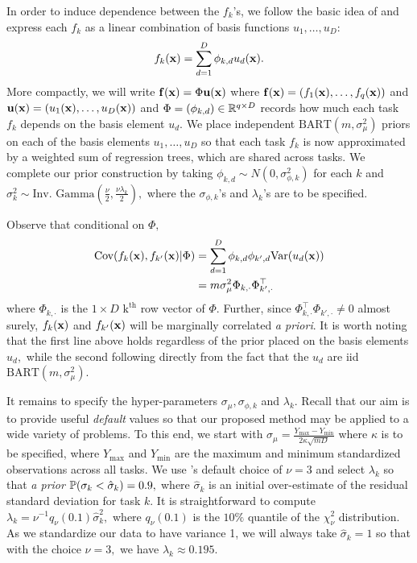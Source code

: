 \documentclass[12pt]{article}
\begin{document}
In order to induce dependence between the $f_{k}$'s, we follow the basic idea of \citet{Teh2005} and express each $f_{k}$ as a linear combination of basis functions $u_{1}, \ldots, u_{D}$:
$$
f_{k}(\bx) = \sum_{d = 1}^{D}{\phi_{k,d}u_{d}(\bx)}.
$$
More compactly, we will write $\bf(\bx) = \Phi\bu(\bx)$ where $\bf(\bx) = (f_{1}(\bx), \ldots, f_{q}(\bx))$ and $\bu(\bx) = (u_{1}(\bx), \ldots, u_{D}(\bx))$ and $\Phi = (\phi_{k,d}) \in \R^{q \times D}$ records how much each task $f_{k}$ depends on the basis element $u_{d}.$
We place independent $\text{BART}(m, \sigma^{2}_{\mu})$ priors on each of the basis elements $u_{1}, \ldots, u_{D}$ so that each task $f_{k}$ is now approximated by a weighted sum of regression trees, which are shared across tasks.
We complete our prior construction by taking $\phi_{k,d} \sim N(0,\sigma^{2}_{\phi,k})$ for each $k$ and $\sigma^{2}_{k} \sim \text{Inv. Gamma}\left(\frac{\nu}{2}, \frac{\nu\lambda_{k}}{2}\right),$ where the $\sigma_{\phi,k}$'s and $\lambda_{k}$'s are to be specified. 

Observe that conditional on $\Phi,$ 
\begin{align*}
\text{Cov}(f_{k}(\bx), f_{k'}(\bx) | \Phi) &= \sum_{d = 1}^{D}{\phi_{k,d}\phi_{k',d}\text{Var}(u_{d}(\bx))} \\
&= m\sigma^{2}_{\mu}\Phi_{k,\cdot}\Phi_{k',\cdot}^{\top}
\end{align*}
where $\Phi_{k,\cdot}$ is the $1 \times D$ $\text{k}^{\text{th}}$ row vector of $\Phi.$
Further, since $\Phi_{k,\cdot}^{\top}\Phi_{k',\cdot} \neq 0$ almost surely, $f_{k}(\bx)$ and $f_{k'}(\bx)$ will be marginally correlated \textit{a priori}.
It is worth noting that the first line above holds regardless of the prior placed on the basis elements $u_{d},$ while the second following directly from the fact that the $u_{d}$ are iid $\text{BART}(m,\sigma^{2}_{\mu}).$

It remains to specify the hyper-parameters $\sigma_{\mu}, \sigma_{\phi,k}$ and $\lambda_{k}.$
Recall that our aim is to provide useful \textit{default} values so that our proposed method may be applied to a wide variety of problems.
To this end, we start with $\sigma_{\mu} = \frac{Y_{\max} - Y_{\min}}{2\kappa \sqrt{mD}}$ where $\kappa$ is to be specified, where $Y_{\max}$ and $Y_{\min}$ are the maximum and minimum standardized observations across all tasks.
We use \citet{Chipman2010}'s default choice of $\nu = 3$ and select  $\lambda_{k}$ so that \textit{a prior} $\P(\sigma_{k} < \hat{\sigma}_{k}) = 0.9,$ where $\hat{\sigma}_{k}$ is an initial over-estimate of the residual standard deviation for task $k.$
It is straightforward to compute $\lambda_{k} = \nu^{-1}q_{\nu}(0.1)\hat{\sigma}_{k}^{2},$ where $q_{\nu}(0.1)$ is the $10\%$ quantile of the $\chi^{2}_{\nu}$ distribution.
As we standardize our data to have variance 1, we will always take $\hat{\sigma}_{k} = 1$ so that with the choice $\nu = 3,$ we have $\lambda_{k} \approx 0.195.$
\end{document}
